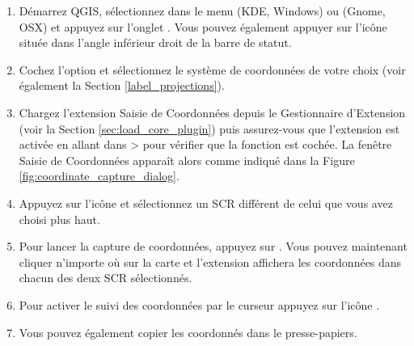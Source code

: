 \begin{enumerate}
  \item Démarrez QGIS, sélectionnez  dans le menu 
   (KDE, Windows) ou  (Gnome, OSX) 
  et appuyez sur l'onglet .
  Vous pouvez également appuyer sur l'icône 
  située dans l'angle inférieur droit de la barre de statut.
  \item Cochez l'option  et
  sélectionnez le système de coordonnées de votre choix (voir également
  la Section \ref{label_projections}).
  \item Chargez l'extension Saisie de Coordonnées depuis le Gestionnaire
  d'Extension (voir la Section \ref{sec:load_core_plugin}) puis assurez-vous
  que l'extension est activée en allant dans  >  
  pour vérifier que la fonction  est cochée. 
   La fenêtre Saisie de Coordonnées apparaît alors comme indiqué dans 
  la Figure \ref{fig:coordinate_capture_dialog}.
  \item Appuyez sur l'icône  
  et sélectionnez un SCR différent de celui que vous avez choisi plus haut.
  \item Pour lancer la capture de coordonnées, appuyez sur . Vous pouvez maintenant cliquer n'importe où sur la carte et l'extension affichera les coordonnées dans chacun des deux SCR sélectionnés.
  \item Pour activer le suivi des coordonnées par le curseur appuyez sur l'icône .
  \item Vous pouvez également copier les coordonnés dans le presse-papiers.
\end{enumerate}

\newpage

